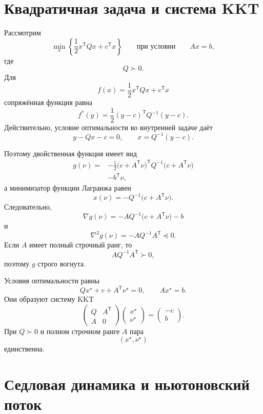 \section{Квадратичная задача и система KKT}

Рассмотрим
\[
    \min_x
    \left\{
        \frac12x^{\mathsf T}Qx+c^{\mathsf T}x
    \right\}
    \qquad
    \text{при условии}
    \qquad
    Ax=b,
\]
где
\[
    Q\succ0.
\]
Для
\[
    f(x)
    =
    \frac12x^{\mathsf T}Qx+c^{\mathsf T}x
\]
сопряжённая функция равна
\[
    f^\ast(y)
    =
    \frac12
    (y-c)^{\mathsf T}
    Q^{-1}
    (y-c).
\]
Действительно, условие оптимальности во внутренней задаче даёт
\[
    y-Qx-c=0,
    \qquad
    x=Q^{-1}(y-c).
\]

Поэтому двойственная функция имеет вид
\[
\begin{aligned}
    g(\nu)
    ={}&
    -\frac12
    \bigl(
        c+A^{\mathsf T}\nu
    \bigr)^{\mathsf T}
    Q^{-1}
    \bigl(
        c+A^{\mathsf T}\nu
    \bigr)
    \\
    &-
    b^{\mathsf T}\nu,
\end{aligned}
\]
а минимизатор функции Лагранжа равен
\[
    x(\nu)
    =
    -Q^{-1}
    \bigl(
        c+A^{\mathsf T}\nu
    \bigr).
\]
Следовательно,
\[
    \nabla g(\nu)
    =
    -AQ^{-1}
    \bigl(
        c+A^{\mathsf T}\nu
    \bigr)
    -
    b
\]
и
\[
    \nabla^2g(\nu)
    =
    -AQ^{-1}A^{\mathsf T}
    \preceq0.
\]
Если \(A\) имеет полный строчный ранг, то
\[
    AQ^{-1}A^{\mathsf T}\succ0,
\]
поэтому \(g\) строго вогнута.

Условия оптимальности равны
\[
    Qx^\star+c+A^{\mathsf T}\nu^\star=0,
    \qquad
    Ax^\star=b.
\]
Они образуют систему KKT
\[
\begin{pmatrix}
    Q&A^{\mathsf T}\\
    A&0
\end{pmatrix}
\begin{pmatrix}
    x^\star\\
    \nu^\star
\end{pmatrix}
=
\begin{pmatrix}
    -c\\
    b
\end{pmatrix}.
\]
При \(Q\succ0\) и полном строчном ранге \(A\) пара
\[
    (x^\star,\nu^\star)
\]
единственна.

\section{Седловая динамика и ньютоновский поток}

